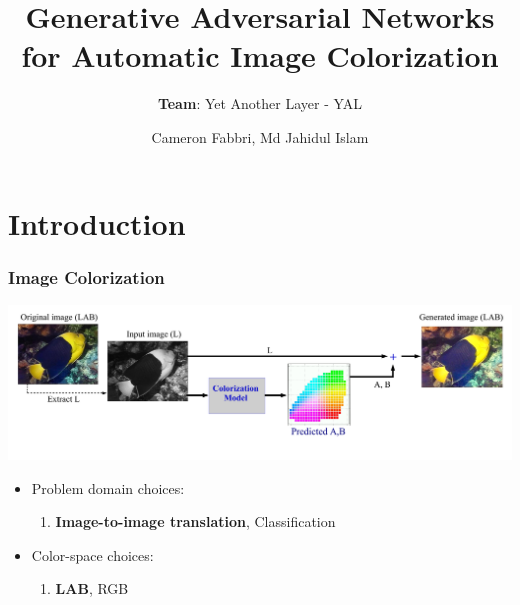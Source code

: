 \documentclass{beamer}
\title{Generative Adversarial Networks for Automatic Image Colorization}
\subtitle{\textbf{Team}: Yet Another Layer - YAL}
\author{Cameron Fabbri, Md Jahidul Islam}
\begin{document}
\date{}
\begin{frame}
\thispagestyle{empty}
\titlepage
\end{frame}

\section*{Introduction}
\begin{frame}
\frametitle{\textbf{Image Colorization}}

\includegraphics[width=\linewidth]{6.pdf}

\begin{itemize}
  \item Problem domain choices:
  
	\begin{enumerate}[$-$]
	\item  \textbf{Image-to-image translation}, Classification
	\end{enumerate}
	
	\item Color-space choices:
  
	\begin{enumerate}[$-$]
	\item  \textbf{LAB}, RGB
	\end{enumerate}
	
	
\end{itemize}

\end{frame}
\end{document}
